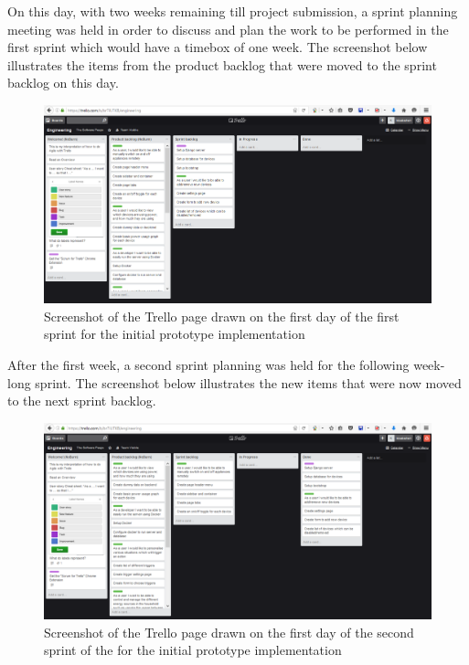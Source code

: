 \documentclass[10pt,twocolumn]{witseiepaper}
\begin{document}
	On this day, with two weeks remaining till project submission, a sprint planning meeting was held in order to discuss and plan the work to be performed in the first sprint which would have a timebox of one week. The screenshot below illustrates the items from the product backlog that were moved to the sprint backlog on this day. 
	
	\begin{figure}[H]
		\centering
		\includegraphics[width=\linewidth]{sprint_backlog_1}
		\caption{Screenshot of the Trello page drawn on the first day of the first sprint for the initial prototype implementation}
		\label{fig:sprint_backlog_1}
	\end{figure}
	
	After the first week, a second sprint planning was held for the following week-long sprint. The screenshot below illustrates the new items that were now moved to the next sprint backlog. 
	
	\begin{figure}[H]
		\centering
		\includegraphics[width=\linewidth]{sprint_backlog_2}
		\caption{Screenshot of the Trello page drawn on the first day of the second sprint of the for the initial prototype implementation}
		\label{fig:sprint_backlog_2}
	\end{figure}
	
\end{document}
